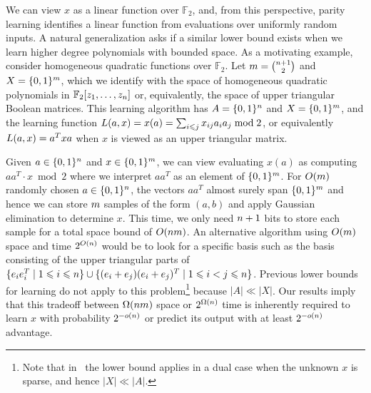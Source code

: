 We can view $x$ as a linear function over $\mathbb{F}_2$,
and, from this perspective,
parity learning identifies a linear function from evaluations over
uniformly random inputs.
A natural generalization asks if a similar lower bound exists when we learn
higher degree polynomials with bounded space. 
As a motivating example, consider homogeneous quadratic functions over
$\mathbb{F}_2$.
Let $m=\binom{n+1}{2}$ and $X=\{0,1\}^m$, which we identify with the space of
homogeneous quadratic polynomials in $\mathbb{F}_2[z_1,\ldots,z_n]$
or, equivalently, the space of upper triangular Boolean matrices.
This learning algorithm has $A=\{0,1\}^n$ and $X=\{0,1\}^m$, 
and the learning function $L(a,x)=x(a) =\sum_{i\leqslant j} x_{ij}a_i a_j\bmod 2$,
or equivalently $L(a,x)=a^T x a$ when $x$ is viewed as an upper triangular
matrix.

Given $a\in \{0,1\}^n$ and $x\in \{0,1\}^m$, we can view evaluating $x(a)$
as computing $aa^T\cdot x\bmod 2$ where we interpret $aa^T$ as an element
of $\{0,1\}^m$.
For $O(m)$ randomly chosen $a\in \{0,1\}^n$, the vectors $aa^T$ almost
surely span $\{0,1\}^m$ and hence we can store $m$ samples of
the form $(a,b)$ and apply Gaussian elimination to determine $x$.
This time, we only need $n+1$ bits to store each sample for a total space
bound of $O(n m)$.  
An alternative algorithm using $O(m)$ space and time $2^{O(n)}$ would be to look
for a specific basis such as the basis consisting of the
upper triangular parts of $\{e_i e_i^T\mid 1\leqslant i\leqslant n\}\cup
\{(e_i+e_j)(e_i+e_j)^T\mid 1\leqslant i<j \leqslant n\}$.
Previous lower bounds for learning do not apply to this problem\footnote{Note that in~\cite{DBLP:conf/stoc/KolRT17} the lower bound
applies in a dual case when the unknown $x$ is sparse, and hence $|X|\ll |A|$.}
because $|A|\ll |X|$. 
Our results imply that this tradeoff between $\Omega(n m)$ space or
$2^{\Omega(n)}$ time
is inherently required to learn $x$ with probability $2^{-o(n)}$ or predict its output with at least $2^{-o(n)}$ advantage.



